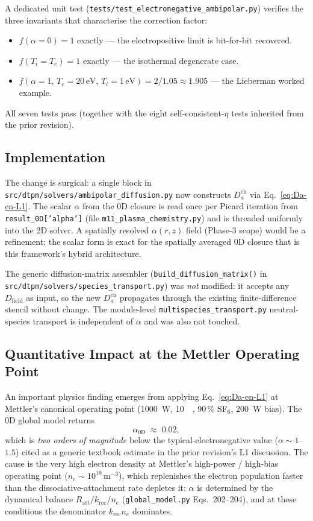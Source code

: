 A dedicated unit test
(\texttt{tests/test\_electronegative\_ambipolar.py}) verifies the three
invariants that characterise the correction factor:
\begin{itemize}
  \item $f(\alpha{=}0) = 1$ exactly — the electropositive limit is bit-for-bit recovered.
  \item $f(T_i{=}T_e) = 1$ exactly — the isothermal degenerate case.
  \item $f(\alpha{=}1,\,T_e{=}20\,\text{eV},\,T_i{=}1\,\text{eV})
  = 2/1.05 \approx 1.905$ — the Lieberman worked example.
\end{itemize}
All seven tests pass (together with the eight self-consistent-$\eta$ tests
inherited from the prior revision).

\subsection{Implementation}

The change is surgical: a single block in
\texttt{src/dtpm/solvers/ambipolar\_diffusion.py} now constructs
$D_a^\mathrm{en}$ via Eq.~\ref{eq:Da-en-L1}.  The scalar
$\alpha$ from the 0D closure is read once per Picard iteration from
\texttt{result\_0D['alpha']} (file \texttt{m11\_plasma\_chemistry.py}) and
is threaded uniformly into the 2D solver.  A spatially resolved
$\alpha(r,z)$ field (Phase-3 scope) would be a refinement; the scalar
form is exact for the spatially averaged 0D closure that is this
framework's hybrid architecture.

The generic diffusion-matrix assembler
(\texttt{build\_diffusion\_matrix()} in
\texttt{src/dtpm/solvers/species\_transport.py}) was \emph{not} modified:
it accepts any $D_\mathrm{field}$ as input, so the new $D_a^\mathrm{en}$
propagates through the existing finite-difference stencil without change.
The module-level \texttt{multispecies\_transport.py} neutral-species
transport is independent of $\alpha$ and was also not touched.

\subsection{Quantitative Impact at the Mettler Operating Point}
\label{sec:L1-finding-alpha-small}

An important physics finding emerges from applying Eq.~\ref{eq:Da-en-L1}
at Mettler's canonical operating point (\SI{1000}{\watt}, \SI{10}{\milli\torr},
90\,\% SF$_6$, \SI{200}{\watt} bias).  The 0D global model returns
\[
  \alpha_{0\mathrm{D}} \;\approx\; 0.02,
\]
which is \emph{two orders of magnitude} below the typical-electronegative
value ($\alpha \sim 1$--$1.5$) cited as a generic textbook estimate in the
prior revision's L1 discussion.  The cause is the very high electron density
at Mettler's high-power / high-bias operating point
($n_e \sim 10^{19}$\,m$^{-3}$), which replenishes the electron population
faster than the dissociative-attachment rate depletes it: $\alpha$ is
determined by the dynamical balance $R_\mathrm{att}/k_\mathrm{rec}/n_e$
(\texttt{global\_model.py} Eqs.~202--204), and at these conditions the
denominator $k_\mathrm{rec} n_e$ dominates.


